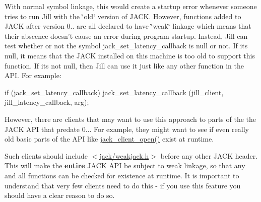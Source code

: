 \-With normal symbol linkage, this would create a startup error whenever someone tries to run \-Jill with the \char`\"{}old\char`\"{} version of \-J\-A\-C\-K. \-However, functions added to \-J\-A\-C\-K after version 0.. are all declared to have \char`\"{}weak\char`\"{} linkage which means that their abscence doesn't cause an error during program startup. \-Instead, \-Jill can test whether or not the symbol jack\-\_\-set\-\_\-latency\-\_\-callback is null or not. \-If its null, it means that the \-J\-A\-C\-K installed on this machine is too old to support this function. \-If its not null, then \-Jill can use it just like any other function in the \-A\-P\-I. \-For example\-:


\begin{DoxyCode}
 if (jack_set_latency_callback) {
       jack_set_latency_callback (jill_client, jill_latency_callback, arg);
 }
\end{DoxyCode}


\-However, there are clients that may want to use this approach to parts of the the \-J\-A\-C\-K \-A\-P\-I that predate 0... \-For example, they might want to see if even really old basic parts of the \-A\-P\-I like \hyperlink{jack_8h_abbd2041bca191943b6ef29a991a131c5}{jack\-\_\-client\-\_\-open()} exist at runtime.

\-Such clients should include $<$\hyperlink{weakjack_8h}{jack/weakjack.\-h}$>$ before any other \-J\-A\-C\-K header. \-This will make the {\bfseries entire} \-J\-A\-C\-K \-A\-P\-I be subject to weak linkage, so that any and all functions can be checked for existence at runtime. \-It is important to understand that very few clients need to do this -\/ if you use this feature you should have a clear reason to do so. 